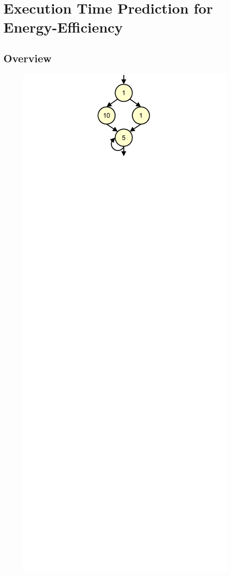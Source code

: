 \section{Execution Time Prediction for Energy-Efficiency}
\label{sec:exec_time_prediction.prediction}

\subsection{Overview}
\label{sec:exec_time_prediction.prediction.overview}

\begin{figure}
  \begin{center}
    \includegraphics{exec_time_prediction/figs/cfg.pdf}

\end{center}
\end{figure}
